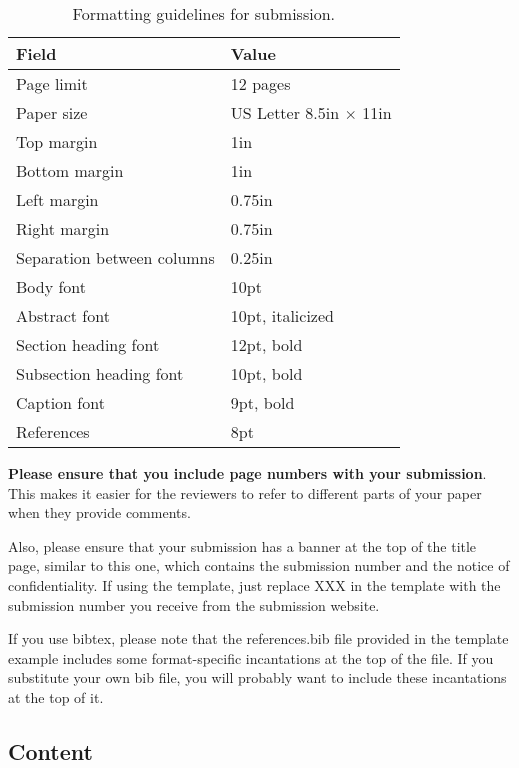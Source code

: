 \begin{table}[h!]
  \centering
  \begin{tabular}{|l|l|}
    \hline
    \textbf{Field} & \textbf{Value}\\
    \hline
    \hline
    Page limit & 12 pages\\
    \hline
    Paper size & US Letter 8.5in $\times$ 11in\\
    \hline
    Top margin & 1in\\
    \hline
    Bottom margin & 1in\\
    \hline
    Left margin & 0.75in\\
    \hline
    Right margin & 0.75in\\
    \hline
    Separation between columns & 0.25in\\
    \hline
    Body font & 10pt\\
    \hline
    Abstract font & 10pt, italicized\\
    \hline
    Section heading font & 12pt, bold\\
    \hline
    Subsection heading font & 10pt, bold\\
    \hline
    Caption font & 9pt, bold\\
    \hline
    References & 8pt\\
    \hline
  \end{tabular}
  \caption{Formatting guidelines for submission. }
  \label{table:formatting}
\end{table}

\textbf{Please ensure that you include page numbers with your
submission}. This makes it easier for the reviewers to refer to
different parts of your paper when they provide comments.

Also, please ensure that your submission has a banner at the top of 
the title page, similar to this one, which contains the submission
number and the notice of confidentiality.  If using the template,
just replace XXX in the template with the submission number
you receive from the submission website.

If you use bibtex, please note that the references.bib file provided in the
template example includes some format-specific incantations at the top of the
file.  If you substitute your own bib file, you will probably want to include
these incantations at the top of it.

\subsection{Content}

